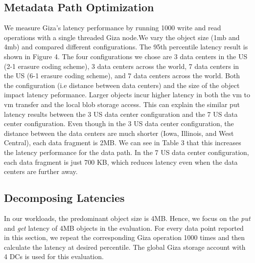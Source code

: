{\subsection{Metadata Path Optimization}
We measure Giza's latency performance by running 1000 write and read operations with a single threaded Giza node.We vary the object size (1mb and 4mb) and compared different configurations. 
The 95th percentile latency result is shown in Figure 4. The four configurations we chose are 3 data centers in the US (2-1 erasure coding scheme), 3 data centers across the world, 7 data centers in the US (6-1 erasure coding scheme), and 7 data centers across the world. Both the configuration (i.e distance between data centers) and the size of the object impact latency peformance. Larger objects incur higher latency in both the vm to vm transfer and the local blob storage access. This can explain the similar put latency results between the 3 US data center configuration and the 7 US data center configuration. Even though in the 3 US data center configuration, the distance between the data centers are much shorter (Iowa, Illinois, and West Central), each data fragment is 2MB. We can see in Table 3 that this increases the latency performance for the data path. In the 7 US data center configuration, each data fragment is just 700 KB, which reduces latency even when the data centers are further away. 

}

\subsection{Decomposing \name Latencies}

In our workloads, the predominant object size is 4MB. Hence, we focus on the {\em put} and {\em get} latency of 4MB objects in the evaluation. For every data point reported in this section, we repeat the corresponding Giza operation 1000 times and then calculate the latency at desired percentile. The global Giza storage account with 4 DCs is used for this evaluation.

